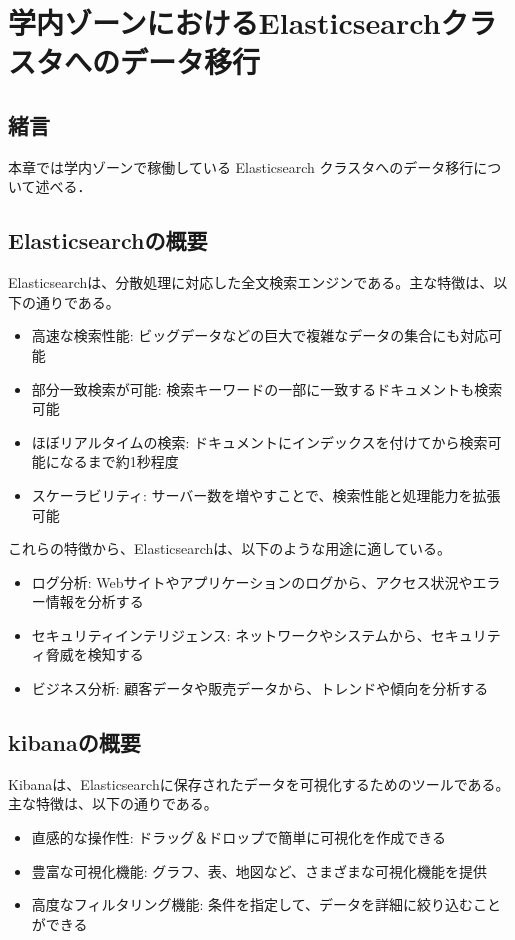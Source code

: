 
\chapter{学内ゾーンにおけるElasticsearchクラスタへのデータ移行}
\label{chap:third}

\section{緒言}
本章では学内ゾーンで稼働している Elasticsearch クラスタへのデータ移行について述べる．

\section{Elasticsearchの概要}
Elasticsearchは、分散処理に対応した全文検索エンジンである。主な特徴は、以下の通りである。

\begin{itemize}
  \item 高速な検索性能: ビッグデータなどの巨大で複雑なデータの集合にも対応可能
  \item 部分一致検索が可能: 検索キーワードの一部に一致するドキュメントも検索可能
  \item ほぼリアルタイムの検索: ドキュメントにインデックスを付けてから検索可能になるまで約1秒程度
  \item スケーラビリティ: サーバー数を増やすことで、検索性能と処理能力を拡張可能
\end{itemize}

これらの特徴から、Elasticsearchは、以下のような用途に適している。

\begin{itemize}
  \item ログ分析: Webサイトやアプリケーションのログから、アクセス状況やエラー情報を分析する
  \item セキュリティインテリジェンス: ネットワークやシステムから、セキュリティ脅威を検知する
  \item ビジネス分析: 顧客データや販売データから、トレンドや傾向を分析する
\end{itemize}

\section{kibanaの概要}

Kibanaは、Elasticsearchに保存されたデータを可視化するためのツールである。主な特徴は、以下の通りである。

\begin{itemize}
  \item 直感的な操作性: ドラッグ＆ドロップで簡単に可視化を作成できる
  \item 豊富な可視化機能: グラフ、表、地図など、さまざまな可視化機能を提供
  \item 高度なフィルタリング機能: 条件を指定して、データを詳細に絞り込むことができる
\end{itemize}

